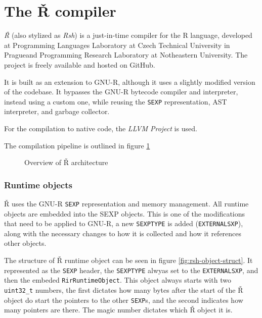 \newpage
\section{The Ř compiler}

\textit{Ř} (also stylized as \textit{Rsh}) is a just-in-time compiler for the R language, developed at Programming Languages Laboratory at Czech Technical University in Prague\todocite and Programming Research Laboratory at Notheastern University\todocite. The project is freely available and hosted on GitHub.

It is built as an extension to GNU-R, although it uses a slightly modified version of the codebase. It bypasses the GNU-R bytecode compiler and interpreter, instead using a custom one, while reusing the \texttt{SEXP} representation, AST interpreter, and garbage collector.

For the compilation to native code, the \textit{LLVM Project}\cite{llvm} is used.

The compilation pipeline is outlined in figure \ref{fig:rsh-archit}

\begin{figure}
	\centering
  \caption{Overview of Ř architecture\cite{reusing-jit}}\label{fig:rsh-archit}
\end{figure}

\subsubsection*{Runtime objects}


Ř uses the GNU-R \texttt{SEXP} representation and memory management. All runtime objects are embedded into the SEXP objects. This is one of the modifications that need to be applied to GNU-R, a new \texttt{SEXPTYPE} is added (\texttt{EXTERNALSXP}), along with the necessary changes to how it is collected and how it references other objects.

The structure of Ř runtime object can be seen in figure \ref{fig:rsh-object-struct}. It represented as the \texttt{SEXP} header, the \texttt{SEXPTYPE} alwyas set to the \texttt{EXTERNALSXP}, and then the embeded \texttt{RirRuntimeObject}. This object always starts with two \texttt{uint32\_t} numbers, the first dictates how many bytes after the start of the Ř object do start the pointers to the other \texttt{SEXP}s, and the second indicates how many pointers are there. The magic number dictates which Ř object it is.

